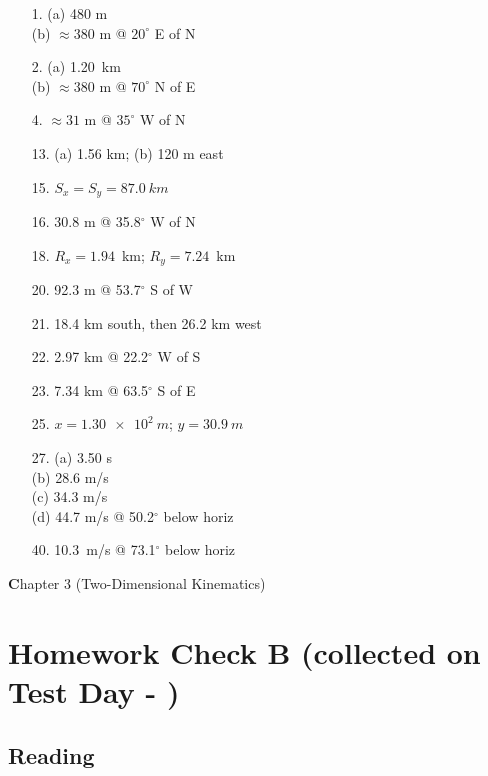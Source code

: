 \documentclass[10pt]{exam}
\def\mytitle{Chapter 3 (Two-Dimensional Kinematics)}
\def\mymaketitle{
  \begin{flushleft}
    {\LARGE \textbf \mytitle \par}
  \end{flushleft}
}
\begin{document}
\begin{multicols}{3}

  \begin{itemize}[noitemsep]
    \item[1. ] (a) 480 m \\ 
               (b) $\approx 380$ m @ $20^\circ$ E of N
    \item[2. ] (a) 1.20~km \\
               (b) $\approx 380$ m @ $70^\circ$ N of E 
    \item[4. ] $\approx 31$ m @ $35^\circ$ W of N
    \item[13.] (a) 1.56 km; (b) 120 m east
    \item[15.] $S_x=S_y=\SI{87.0}{km}$
    \item[16.] 30.8 m @ 35.8$^\circ$ W of N
    \item[18.] $R_x = 1.94$~km; $R_y = 7.24$~km
    \item[20.] 92.3 m @ 53.7$^\circ$ S of W
    \item[21.] 18.4 km south, then 26.2 km west
    \item[22.] 2.97 km @ 22.2$^\circ$ W of S
    \item[23.] 7.34 km @ 63.5$^\circ$ S of E
    \item[25.] $x=\SI{1.30e2}{m}$; $y=\SI{30.9}{m}$
    \item[27.] (a) 3.50 s \\
               (b) 28.6 m/s \\
               (c) 34.3 m/s \\
               (d) 44.7 m/s @ 50.2$^\circ$ below horiz
  \item[40.] 10.3~m/s @ 73.1$^\circ$ below horiz
    
  \end{itemize}
  
\end{multicols}




\pagebreak

\mymaketitle

\section*{Homework Check B (collected on Test Day - \fillin[][6em])}

\subsection*{Reading}
\end{document}
